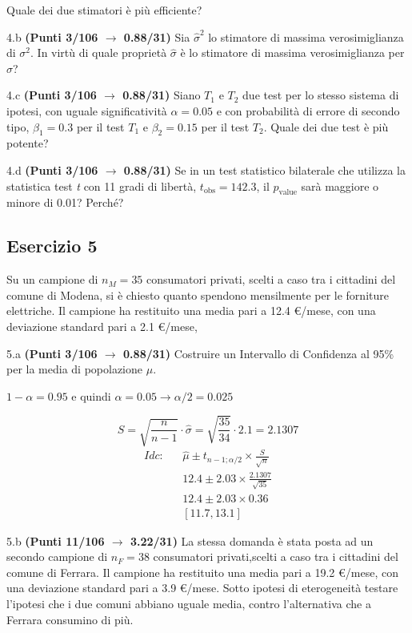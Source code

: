 \documentclass[
  11pt,
]{book}
\theoremstyle{mytheoremstyle}
\theoremstyle{mydefstyle}
\newenvironment{sol}
  {
  \begin{tcolorbox}[enhanced,breakable,arc=0.1mm,boxrule=1pt,colback=white,colframe=iblue,
  title=\bf \fontfamily{lmss}\selectfont \hspace{.5 cm} Soluzione,drop fuzzy shadow]

}{
\end{tcolorbox}
  }
\begin{document}
Quale dei due stimatori è più efficiente?

4.b \textbf{(Punti 3/106 \(\rightarrow\) 0.88/31)} Sia \(\hat\sigma^2\) lo stimatore di massima verosimiglianza
di \(\sigma^2\). In virtù di quale proprietà \(\hat \sigma\) è lo stimatore di
massima verosimiglianza per \(\sigma\)?

4.c \textbf{(Punti 3/106 \(\rightarrow\) 0.88/31)} Siano \(T_1\) e \(T_2\) due test per lo stesso sistema di ipotesi,
con uguale significatività \(\alpha=0.05\) e con probabilità di errore di secondo tipo, \(\beta_1=0.3\)
per il test \(T_1\) e \(\beta_2=0.15\) per il test \(T_2\). Quale dei due test è più potente?

4.d \textbf{(Punti 3/106 \(\rightarrow\) 0.88/31)} Se in un test statistico bilaterale che utilizza
la statistica test \emph{t} con 11 gradi di libertà, \(t_\text{obs}=142.3\),
il \(p_\text{value}\) sarà maggiore o minore di 0.01? Perché?

\subsection{Esercizio 5}\label{esercizio-5-15}

Su un campione di \(n_M=35\) consumatori privati, scelti a caso tra i cittadini del comune di Modena,
si è chiesto quanto spendono mensilmente per le forniture elettriche.
Il campione ha restituito una media pari a 12.4 €/mese, con una deviazione standard pari a 2.1 €/mese,

5.a \textbf{(Punti 3/106 \(\rightarrow\) 0.88/31)} Costruire un Intervallo di Confidenza al 95\% per la media di popolazione \(\mu\).

\begin{sol}
\(1-\alpha =0.95\) e quindi \(\alpha=0.05\rightarrow \alpha/2=0.025\)

\[
      S  =\sqrt{\frac {n}{n-1}}\cdot\hat\sigma =
     \sqrt{\frac { 35 }{ 34 }}\cdot 2.1 = 2.1307 
\]
\begin{eqnarray*}
  Idc: & &  \hat\mu \pm  t_{n-1;\alpha/2} \times \frac{S}{\sqrt{n}} \\
     & &  12.4 \pm  2.03 \times \frac{ 2.1307 }{\sqrt{ 35 }} \\
     & &  12.4 \pm  2.03 \times  0.36 \\
     & & [ 11.7 ,  13.1 ]
\end{eqnarray*}

\end{sol}

5.b \textbf{(Punti 11/106 \(\rightarrow\) 3.22/31)} La stessa domanda è stata posta ad un secondo campione di \(n_F=38\) consumatori privati,scelti a caso tra i cittadini del comune di Ferrara.
Il campione ha restituito una media pari a 19.2 €/mese, con una deviazione standard pari a 3.9 €/mese. Sotto ipotesi di eterogeneità testare l'ipotesi che i due comuni abbiano uguale media, contro l'alternativa che a Ferrara consumino di più.
\end{document}
